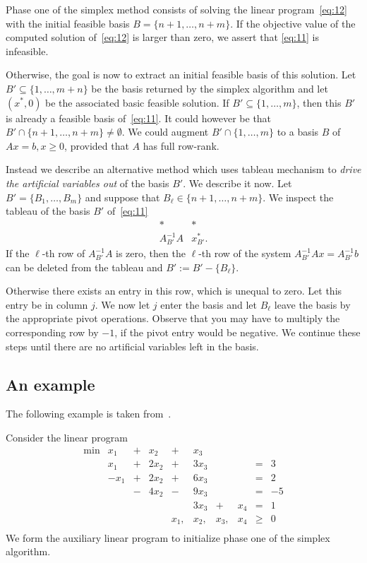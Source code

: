 {Phase one} of the simplex method consists of solving the linear
program~\eqref{eq:12} with the initial feasible basis
$B=\{n+1,\ldots,n+m\}$.  If the objective value of the computed solution
of~\eqref{eq:12} is larger than zero, we assert that \eqref{eq:11} is
infeasible. 


Otherwise, the goal is now to extract an initial feasible basis of
this solution. 
Let $B' \subseteq\{1,\ldots,m+n\}$ be the basis returned by the simplex
algorithm and let $(x^*,0)$ be the associated basic feasible solution. If
$B' \subseteq\{1,\ldots,m\}$, then this $B'$ is already a feasible  basis
of~\eqref{eq:11}. It could however be that $B' \cap \{n+1,\ldots,n+m\} \neq
\emptyset$. We could augment $B'
\cap\{1,\ldots,m\}$ to a basis $B$ of $Ax = b, x\geq0$, provided that $A$ has
full row-rank. 

Instead we describe  an alternative method which uses tableau mechanism to
\emph{drive the artificial variables out} of the basis $B'$. We
describe it now. Let $B' = \{B_1,\ldots,B_m\}$ and suppose that $B_\ell\in
\{n+1,\ldots,n+m\}$. We inspect the tableau of the basis $B'$
of~\eqref{eq:11} 
\begin{equation}
  \label{eq:13}
    \begin{array}{c|c}
    * & * \\ \hline 
    A_{B'}^{-1}A        & x^*_{B'}.
  \end{array}
\end{equation}
If the $\ell$-th row of $ A_{B'}^{-1}A $ is zero, then the $\ell$-th row
of the system $ A_{B'}^{-1}A x =  A_{B'}^{-1}b$ can be deleted from
the tableau and $B':= B' - \{B_\ell\}$. 

Otherwise there exists an entry in this row, which is unequal to zero.
Let this entry be in column $j$. We now let $j$ enter the basis and
let $B_\ell$ leave the basis by the appropriate pivot operations. 
Observe that you may have to multiply the corresponding row by $-1$,
if the pivot entry would be negative. 
We continue these steps until there are no artificial variables left in
the basis. 


\subsection{An example}

The following example is taken from~\cite[p.~114]{BertsimasTsitsiklis97}.

Consider the linear program
\begin{equation*}
  \begin{array}{rccccccccc}
    \min &  x_1 & + & x_2 & + & x_3 & & &  & \\
    &x_1&+&2x_2&+&3x_3&&&=&3\\ 
    &-x_1&+&2x_2&+&6x_3&&&=&2\\ 
    &&-&4x_2&-&9x_3&&&=&-5\\ 
    &&&&&3x_3&+&x_4&=&1 \\
    &&&&x_1,&x_2,&x_3,&x_4&\geq&0\\
  \end{array}
\end{equation*}
We form the auxiliary linear program to initialize phase one of the
simplex algorithm. 

